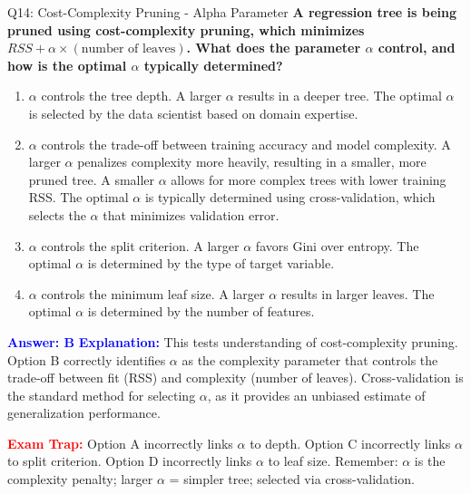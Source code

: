 \documentclass[8pt]{beamer}
\begin{document}
	\begin{frame}{Q14: Cost-Complexity Pruning - Alpha Parameter}
		\fontsize{6.5}{7.5}\selectfont
		\textbf{A regression tree is being pruned using cost-complexity pruning, which minimizes $RSS + \alpha \times (\text{number of leaves})$. What does the parameter $\alpha$ control, and how is the optimal $\alpha$ typically determined?}
		
		\begin{enumerate}
			\item $\alpha$ controls the tree depth. A larger $\alpha$ results in a deeper tree. The optimal $\alpha$ is selected by the data scientist based on domain expertise.
			\item $\alpha$ controls the trade-off between training accuracy and model complexity. A larger $\alpha$ penalizes complexity more heavily, resulting in a smaller, more pruned tree. A smaller $\alpha$ allows for more complex trees with lower training RSS. The optimal $\alpha$ is typically determined using cross-validation, which selects the $\alpha$ that minimizes validation error.
			\item $\alpha$ controls the split criterion. A larger $\alpha$ favors Gini over entropy. The optimal $\alpha$ is determined by the type of target variable.
			\item $\alpha$ controls the minimum leaf size. A larger $\alpha$ results in larger leaves. The optimal $\alpha$ is determined by the number of features.
		\end{enumerate}
		
		\vspace{0.1cm}
		\textcolor{blue}{\textbf{Answer: B}}
		\vspace{0.1cm}
		\textcolor{blue}{\textbf{Explanation:}} This tests understanding of cost-complexity pruning. Option B correctly identifies $\alpha$ as the complexity parameter that controls the trade-off between fit (RSS) and complexity (number of leaves). Cross-validation is the standard method for selecting $\alpha$, as it provides an unbiased estimate of generalization performance.
		
		\textcolor{red}{\textbf{Exam Trap:}} Option A incorrectly links $\alpha$ to depth. Option C incorrectly links $\alpha$ to split criterion. Option D incorrectly links $\alpha$ to leaf size. Remember: $\alpha$ is the complexity penalty; larger $\alpha$ = simpler tree; selected via cross-validation.
	\end{frame}
	
\end{document}

